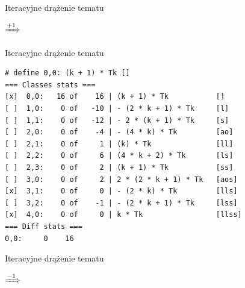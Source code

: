\documentclass[final]{beamer}
\theoremstyle{bluetheorem}
\theoremstyle{bluetheorem}
\theoremstyle{greentheorem}
\newcommand{\includeinlinescaledsvg}[3]{\begin{minipage}{#1\textwidth}\begin{center}\end{center}\end{minipage}}
\begin{document}
\begin{frame}[fragile]{Iteracyjne drążenie tematu}
    \begin{block}{}
        \begin{center}
            \includeinlinescaledsvg{.4}{.4}{lambda__transformations__001a}%
            \(\xRightarrow{+1}\)%
            \includeinlinescaledsvg{.4}{.4}{lambda__transformations__001b}%
        \end{center}
    \end{block}
\end{frame}

\begin{frame}[fragile]{Iteracyjne drążenie tematu}
    \begin{block}{}
\begin{lstlisting}
# define 0,0: (k + 1) * Tk []
=== Classes stats ===
[x]  0,0:   16 of    16 | (k + 1) * Tk           []
[ ]  1,0:    0 of   -10 | - (2 * k + 1) * Tk     [l]
[ ]  1,1:    0 of   -12 | - 2 * (k + 1) * Tk     [s]
[ ]  2,0:    0 of    -4 | - (4 * k) * Tk         [ao]
[ ]  2,1:    0 of     1 | (k) * Tk               [ll]
[ ]  2,2:    0 of     6 | (4 * k + 2) * Tk       [ls]
[ ]  2,3:    0 of     2 | (k + 1) * Tk           [ss]
[ ]  3,0:    0 of     2 | 2 * (2 * k + 1) * Tk   [aos]
[x]  3,1:    0 of     0 | - (2 * k) * Tk         [lls]
[ ]  3,2:    0 of    -1 | - (2 * k + 1) * Tk     [lss]
[x]  4,0:    0 of     0 | k * Tk                 [llss]
=== Diff stats ===
0,0:     0    16
\end{lstlisting}
    \end{block}
\end{frame}

\begin{frame}[fragile]{Iteracyjne drążenie tematu}
    \begin{block}{}
        \begin{center}
            \includeinlinescaledsvg{.4}{.4}{lambda__transformations__002a}%
            \(\xRightarrow{-1}\)%
            \includeinlinescaledsvg{.4}{.4}{lambda__transformations__002b}%
        \end{center}
    \end{block}
\end{frame}
\end{document}
